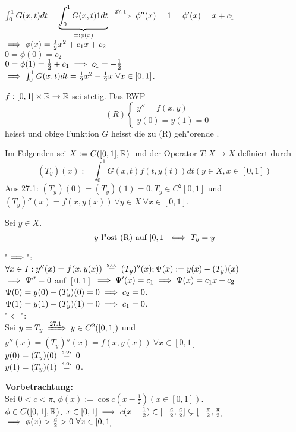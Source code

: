 \documentclass[a4paper,twoside,DIV15,BCOR12mm]{scrbook}
\begin{document}
\begin{beispiel}
$\int_0^1G(x,t)dt=\underbrace{\int_0^1G(x,t)1dt}_{=:\phi(x)}\folgtnach{27.1} \phi''(x)=1=\phi'(x)=x+c_1$\\
$\implies \phi(x)=\frac{1}{2}x^2+c_1x+c_2$\\
$0=\phi(0)=c_2$\\
$0=\phi(1)=\frac{1}{2}+c_1\implies c_1=-\frac{1}{2}$\\
$\implies \int_0^1G(x,t)dt=\frac{1}{2}x^2-\frac{1}{2}x\ \forall x\in[0,1]$.\\
\end{beispiel}
\begin{definition}
$f:[0,1]\times\mathbb{R}\to\mathbb{R}$ sei stetig. Das RWP
\[ \quad
(R)
\begin{cases}
y''=f(x,y)\\
y(0)=y(1)=0
\end{cases}
\]
heisst  und obige Funktion $G$ heisst die zu (R) geh"orende .
\end{definition}
Im Folgenden sei $X:=C([0,1],\mathbb{R})$ und der Operator $T:X\to X$ definiert durch\\
$$(T_y)(x):=\int_0^1G(x,t)f(t,y(t))dt (y\in X, x\in[0,1])$$
Aus 27.1: $(T_y)(0)=(T_y)(1)=0, T_y \in C^2[0,1]$ und $(T_y)''(x)=f(x,y(x))\ \forall y\in X\ \forall x\in[0,1]$.
\begin{satz}
Sei $y\in X$.
$$y \text{ l"ost (R) auf } [0,1] \iff T_y=y$$
\end{satz}
\begin{beweis}
"$\implies$":\\
$\forall x\in I: y''(x) = f(x,y(x)) \gleichnach{s.o.} (T_y)''(x);\Psi(x):=y(x)-(T_y)(x)$\\
$\implies \Psi'' = 0$ auf $[0,1]$ $\implies \Psi'(x) = c_1 \implies \Psi(x) = c_1x+c_2$\\
$\Psi(0)=y(0)-(T_y)(0)=0 \implies c_2=0$.\\
$\Psi(1)=y(1)-(T_y)(1)=0 \implies c_1=0$.\\
"$\Leftarrow$":\\
Sei $y=T_y \folgtnach{27.1} y\in C^2([0,1])$ und $y''(x)=(T_y)''(x)=f(x,y(x))\ \forall x\in[0,1]$\\
$y(0)=(T_y)(0)\gleichnach{s.o.}0$\\
$y(1)=(T_y)(1)\gleichnach{s.o.}0$.
\end{beweis}

\textbf{Vorbetrachtung:}\\
Sei $0<c<\pi$, $\phi(x):=\cos{c(x-\frac{1}{2})}(x\in[0,1])$.\\
$\phi \in C([0,1],\mathbb{R})$. $x\in[0,1]\implies c(x-\frac{1}{2}) \in [-\frac{c}{2},\frac{c}{2}]\subsetneq[-\frac{\pi}{2},\frac{\pi}{2}]$\\
$\implies \phi(x)>\frac{c}{2}>0\ \forall x \in [0,1]$\\
\end{document}
